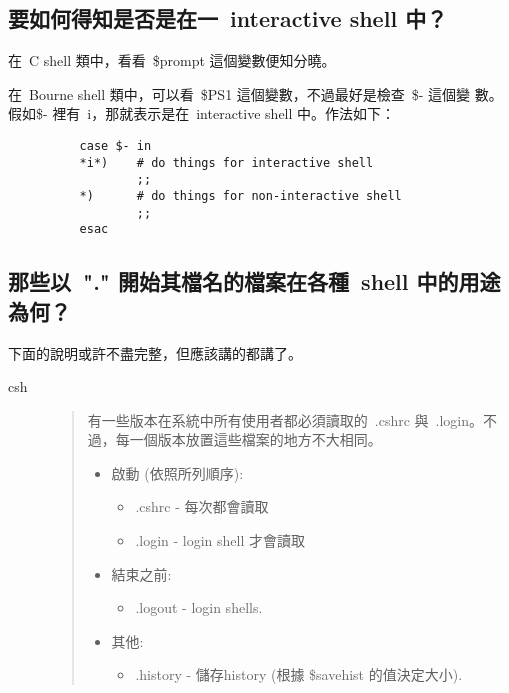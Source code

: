 \documentclass{article}
\begin{document}
\begin{CJK*}{Bg5}{ming}
\subsection{要如何得知是否是在一~interactive shell 中？}

	在~C shell 類中，看看~\$prompt 這個變數便知分曉。

	在~Bourne shell 類中，可以看~\$PS1 這個變數，不過最好是檢查~\$- 這個變
	數。假如\$- 裡有~i，那就表示是在~interactive shell 中。作法如下：
\begin{verbatim}
          case $- in
          *i*)    # do things for interactive shell
                  ;;
          *)      # do things for non-interactive shell
                  ;;
          esac
\end{verbatim}
\subsection{那些以~"." 開始其檔名的檔案在各種~shell 中的用途為何？}
     下面的說明或許不盡完整，但應該講的都講了。
\begin{description}
      \item[csh]
\begin{quote}
	有一些版本在系統中所有使用者都必須讀取的~.cshrc 與~.login。不
	過，每一個版本放置這些檔案的地方不大相同。
	\begin{itemize}
        \item  啟動 (依照所列順序):
	  \begin{itemize}
          \item   .cshrc   - 每次都會讀取
          \item   .login   - login shell 才會讀取
	  \end{itemize}

        \item  結束之前:
	  \begin{itemize}
            \item   .logout  - login shells.
	  \end{itemize}

        \item  其他:
	  \begin{itemize}
             \item  .history - 儲存history (根據 \$savehist 的值決定大小).
	  \end{itemize}
	\end{itemize}
\end{quote}


\end{description}
\end{CJK*}
\end{document}
